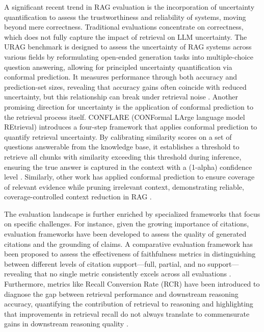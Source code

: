 \documentclass[11pt]{article}
\begin{document}
A significant recent trend in RAG evaluation is the incorporation of uncertainty quantification to assess the trustworthiness and reliability of systems, moving beyond mere correctness. Traditional evaluations concentrate on correctness, which does not fully capture the impact of retrieval on LLM uncertainty. The URAG benchmark is designed to assess the uncertainty of RAG systems across various fields by reformulating open-ended generation tasks into multiple-choice question answering, allowing for principled uncertainty quantification via conformal prediction. It measures performance through both accuracy and prediction-set sizes, revealing that accuracy gains often coincide with reduced uncertainty, but this relationship can break under retrieval noise \cite{ref409}. Another promising direction for uncertainty is the application of conformal prediction to the retrieval process itself. CONFLARE (CONFormal LArge language model REtrieval) introduces a four-step framework that applies conformal prediction to quantify retrieval uncertainty. By calibrating similarity scores on a set of questions answerable from the knowledge base, it establishes a threshold to retrieve all chunks with similarity exceeding this threshold during inference, ensuring the true answer is captured in the context with a (1-alpha) confidence level \cite{ref410}. Similarly, other work has applied conformal prediction to ensure coverage of relevant evidence while pruning irrelevant context, demonstrating reliable, coverage-controlled context reduction in RAG \cite{ref169}.

The evaluation landscape is further enriched by specialized frameworks that focus on specific challenges. For instance, given the growing importance of citations, evaluation frameworks have been developed to assess the quality of generated citations and the grounding of claims. A comparative evaluation framework has been proposed to assess the effectiveness of faithfulness metrics in distinguishing between different levels of citation support---full, partial, and no support---revealing that no single metric consistently excels across all evaluations \cite{ref411}. Furthermore, metrics like Recall Conversion Rate (RCR) have been introduced to diagnose the gap between retrieval performance and downstream reasoning accuracy, quantifying the contribution of retrieval to reasoning and highlighting that improvements in retrieval recall do not always translate to commensurate gains in downstream reasoning quality \cite{ref412}.
\end{document}

